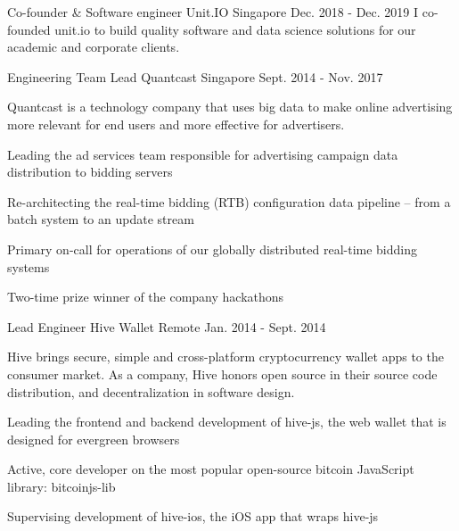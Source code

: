

\begin{cventries}

  \cventry
    {Co-founder \& Software engineer} %
    {Unit.IO} %
    {Singapore} %
    {Dec. 2018 - Dec. 2019} %
    {
      I co-founded unit.io to build quality software and data science solutions for our academic and corporate clients.
    }

  \cventry
    {Engineering Team Lead} %
    {Quantcast} %
    {Singapore} %
    {Sept. 2014 - Nov. 2017} %
    {
      Quantcast is a technology company that uses big data to make online advertising more relevant for end users and more effective for advertisers.
      \begin{cvitems} %
        \item Leading the ad services team responsible for advertising campaign data distribution to bidding servers
        \item Re-architecting the real-time bidding (RTB) configuration data pipeline – from a batch system to an update stream
        \item Primary on-call for operations of our globally distributed real-time bidding systems
        \item Two-time prize winner of the company hackathons
      \end{cvitems}
    }

  \cventry
    {Lead Engineer} %
    {Hive Wallet} %
    {Remote} %
    {Jan. 2014 - Sept. 2014} %
    {
      Hive brings secure, simple and cross-platform cryptocurrency wallet apps to the consumer market. As a company, Hive honors open source in their source code distribution, and decentralization in software design.
      \begin{cvitems} %
        \item Leading the frontend and backend development of hive-js, the web wallet that is designed for evergreen browsers
        \item Active, core developer on the most popular open-source bitcoin JavaScript library: bitcoinjs-lib
        \item Supervising development of hive-ios, the iOS app that wraps hive-js
      \end{cvitems}
    }


\end{cventries}
